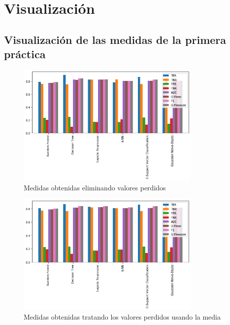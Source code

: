 \section{Visualización}

\subsection{Visualización de las medidas de la primera práctica}

\begin{figure}[H]
\centering
\includegraphics[width=0.8\textwidth]{imagenes/pre-delete.png}
\caption{Medidas obtenidas eliminando valores perdidos}
\end{figure}

\begin{figure}[H]
\centering
\includegraphics[width=0.8\textwidth]{imagenes/pre-mean.png}
\caption{Medidas obtenidas tratando los valores perdidos usando la media}
\end{figure}

